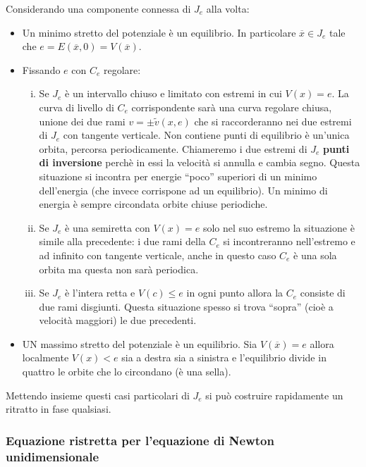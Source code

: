 \documentclass[11pt,a4paper,twoside]{book}
\newenvironment{esempio}[1][Esempio]{ 
  \begin{center}\begin{tcolorbox}[
  title={#1:\\},
  width=0.9\linewidth,
  flush right,
  enhanced jigsaw, 
  colback=white, 
  frame hidden, 
  sharpish corners, arc=3mm,
  borderline west = {1pt}{0pt}{gray},
  borderline south = {1pt}{0pt}{gray},
  coltitle=black, 
  fonttitle=\small\bfseries, 
  attach title to upper, 
  breakable,
  top=2.5pt, bottom=0.3pt]\small
  }{
 \normalsize \end{tcolorbox}\end{center}
}
\theoremstyle{esss}
\theoremstyle{dotless}
\numberwithin{equation}{section} %
\begin{document}
\begin{esempio}[Ricostruiamo alcune curve di livello particolari di $C_e$]
Considerando una componente connessa di $J_e$ alla volta:\begin{itemize}[label=$\cdot$]
\item Un minimo stretto del potenziale è un equilibrio. In particolare $\overline{x}\in J_e$ tale che $e=E(\overline{x},0)=V(\overline{x})$.
\item Fissando $e$ con $C_e$ regolare:
\begin{enumerate}[i.]
	\item Se $J_e$ è un intervallo chiuso e limitato con estremi in cui $V(x)=e$. La curva di livello di $C_e$ corrispondente sarà una curva regolare chiusa, unione dei due rami $v=\pm\tilde{v}(x,e)$ che si raccorderanno nei due estremi di $J_e$ con tangente verticale. Non contiene punti di equilibrio è un'unica orbita, percorsa periodicamente. Chiameremo i due estremi di $J_e$ \textbf{punti di inversione} perchè in essi la velocità si annulla e cambia segno. Questa situazione si incontra per energie ``poco'' superiori di un minimo dell'energia (che invece corrispone ad un equilibrio). Un minimo di energia è sempre circondata orbite chiuse periodiche.
	\item Se $J_e$ è una semiretta con $V(x)=e$ solo nel suo estremo la situazione è simile alla precedente: i due rami della $C_e$ si incontreranno nell'estremo e ad infinito con tangente verticale, anche in questo caso $C_e$ è una sola orbita ma questa non sarà periodica. 
	\item Se $J_e$ è l'intera retta e $V(c)\leq e$ in ogni punto allora la $C_e$ consiste di due rami disgiunti. Questa situazione spesso si trova ``sopra'' (cioè a velocità maggiori) le due precedenti.
\end{enumerate}
\item UN massimo stretto del potenziale è un equilibrio. Sia $V(\overline{x})=e$ allora localmente $V(x)<e$ sia a destra sia a sinistra e l'equilibrio divide in quattro le orbite che lo circondano (è una sella).
\end{itemize}
Mettendo insieme questi casi particolari di $J_e$ si può costruire rapidamente un ritratto in fase qualsiasi.
\end{esempio}

\subsubsection{Equazione ristretta per l'equazione di Newton unidimensionale}
\end{document}
